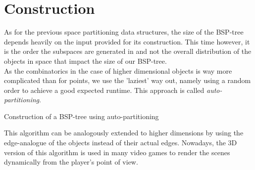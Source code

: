 \section{Construction}
    As for the previous space partitioning data structures, the size of the BSP-tree depends heavily on the input provided for its construction. This time however, it is the order the subspaces are generated in and not the overall distribution of the objects in space that impact the size of our BSP-tree. \\
    As the combinatorics in the case of higher dimensional objects is way more complicated than for points, we use the 'laziest' way out, namely using a random order to achieve a good expected runtime. This approach is called \emph{auto-partitioning}.

    \begin{breakablealgorithm}
        \caption{Construction of a BSP-tree using auto-partitioning}
        \label{alg:bsp_autopartitioning}
        \begin{algorithmic}[1]
                \Else
                \EndIf
                \State{}
            \EndProcedure
        \end{algorithmic}
    \end{breakablealgorithm}

    \begin{remark}
        This algorithm can be analogously extended to higher dimensions by using the edge-analogue of the objects instead of their actual edges. Nowadays, the 3D version of this algorithm is used in many video games to render the scenes dynamically from the player's point of view.
    \end{remark}

